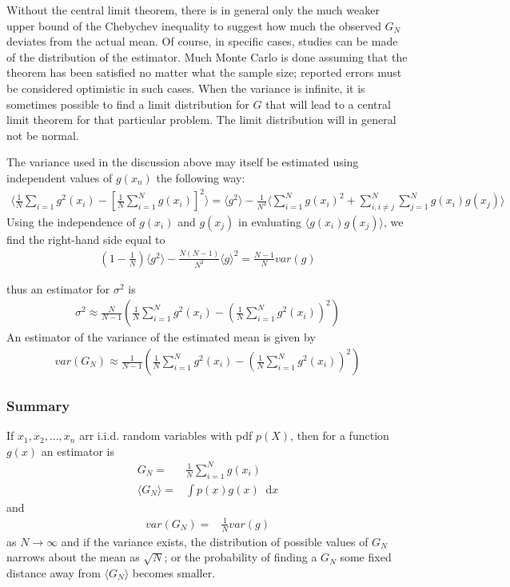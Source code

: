 \documentclass[twoside,english]{uiofysmaster}
\newcommand*\dif{\mathop{}\!\mathrm{d}}
\begin{document}
Without the central limit theorem, there is in general only the much weaker upper bound of the Chebychev inequality to suggest how much the observed $G_N$ deviates from the actual mean. Of course, in specific cases, studies can be made of the distribution of the estimator. Much Monte Carlo is done assuming that the theorem has been satisfied no matter what the sample size; reported errors must be considered optimistic in such cases.
When the variance is infinite, it is sometimes possible to find a limit distribution for $G$ that will lead to a central limit theorem for that particular problem. The limit distribution will in general not be normal.

The variance used in the discussion above may itself be estimated using independent values of $g(x_n)$ the following way:
\begin{align}
	\langle \frac{1}{N} \sum_{i=1} g^2 (x_i) - [\frac{1}{N}\sum_{i=1}^N g(x_i)]^2 \rangle
	= \langle g^2 \rangle - \frac{1}{N^2} \langle
	\sum_{i=1}^N g(x_i)^2 + \sum_{i,i\neq j}^N \sum_{j=1}^N g(x_i) g(x_j) \rangle
\end{align}
Using the independence of $g(x_i)$ and $g(x_j)$ in evaluating $\langle g(x_i) g(x_j)\rangle $, we find the right-hand side equal to 
\begin{align}
	(1- \frac{1}{N}) \langle g^2 \rangle - \frac{N(N-1)}{N^2} \langle g \rangle^2
	= \frac{N-1}{N} var(g)
\end{align}

thus an estimator for $\sigma^2$ is
\begin{align}
	\sigma^2 \approx \frac{N}{N-1} ( \frac{1}{N} \sum_{i=1}^N g^2(x_i) -
	( \frac{1}{N} \sum_{i=1}^N g^2(x_i))^2 )
\end{align}
An estimator of the variance of the estimated mean is given by
\begin{align}
	var(G_N) \approx \frac{1}{N-1} ( \frac{1}{N} \sum_{i=1}^N g^2(x_i) -
	( \frac{1}{N} \sum_{i=1}^N g^2(x_i))^2 )
\end{align}

\subsubsection{Summary}
If $x_1, x_2,...,x_n$ arr i.i.d. random variables with pdf $p(X)$, then for a function $g(x)$ an estimator is
\begin{align}
	G_N =& \frac{1}{N} \sum_{i=1}^N g(x_i) \\
	\langle G_N \rangle =& \int p(x) g(x) \dif x
\end{align}
and
\begin{align}
	var(G_N) =& \frac{1}{N} var(g)
\end{align}
as $N\rightarrow \infty$ and if the variance exists, the distribution of possible values of $G_N$ narrows about the mean as $\sqrt{N}$; or the probability of finding a $G_N$ some fixed distance away from $\langle G_N \rangle$ becomes smaller. 
\end{document}
